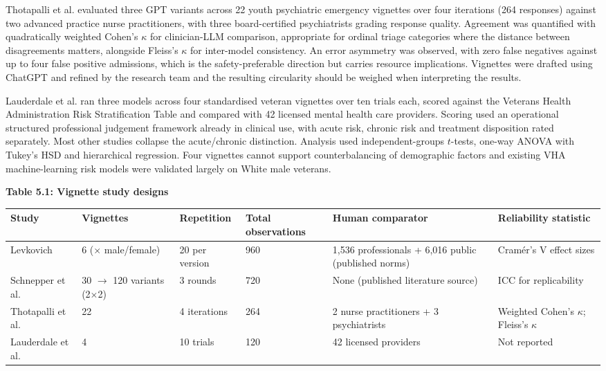 \documentclass[11pt]{article}
\begin{document}
	Thotapalli et al.\cite{pcn5.70159} evaluated three GPT variants across 22 youth psychiatric emergency vignettes over four iterations (264 responses) against two advanced practice nurse practitioners, with three board-certified psychiatrists grading response quality. Agreement was quantified with quadratically weighted Cohen's $\kappa$ for clinician-LLM comparison, appropriate for ordinal triage categories where the distance between disagreements matters, alongside Fleiss's $\kappa$ for inter-model consistency. An error asymmetry was observed, with zero false negatives against up to four false positive admissions, which is the safety-preferable direction but carries resource implications. Vignettes were drafted using ChatGPT and refined by the research team and the resulting circularity should be weighed when interpreting the results.
	
	Lauderdale et al.\cite{Lauderdale2025EffectivenessOG} ran three models across four standardised veteran vignettes over ten trials each, scored against the Veterans Health Administration Risk Stratification Table and compared with 42 licensed mental health care providers. Scoring used an operational structured professional judgement framework already in clinical use, with acute risk, chronic risk and treatment disposition rated separately. Most other studies collapse the acute/chronic distinction. Analysis used independent-groups $t$-tests, one-way ANOVA with Tukey's HSD and hierarchical regression. Four vignettes cannot support counterbalancing of demographic factors and existing VHA machine-learning risk models were validated largely on White male veterans.
	
	\begin{center}
		\textbf{Table 5.1: Vignette study designs}
		\vspace{2pt}
		
		\scriptsize
		\setlength{\tabcolsep}{3pt}\renewcommand{\arraystretch}{1.1}
		\begin{tabularx}{\textwidth}{|X|X|X|X|X|X|}
			\hline
			\textbf{Study} & \textbf{Vignettes} & \textbf{Repetition} & \textbf{Total observations} & \textbf{Human comparator} & \textbf{Reliability statistic} \\
			\hline
			Levkovich\cite{ejihpe15010009} & 6 ($\times$ male/female) & 20 per version & 960 & 1,536 professionals + 6,016 public (published norms) & Cram\'er's V effect sizes \\
			\hline
			Schnepper et al.\cite{SCHNEPPER2025} & 30 $\rightarrow$ 120 variants (2$\times$2) & 3 rounds & 720 & None (published literature source) & ICC for replicability \\
			\hline
			Thotapalli et al.\cite{pcn5.70159} & 22 & 4 iterations & 264 & 2 nurse practitioners + 3 psychiatrists & Weighted Cohen's $\kappa$; Fleiss's $\kappa$ \\
			\hline
			Lauderdale et al.\cite{Lauderdale2025EffectivenessOG} & 4 & 10 trials & 120 & 42 licensed providers & Not reported \\
			\hline
		\end{tabularx}
	\end{center}
	
\end{document}
